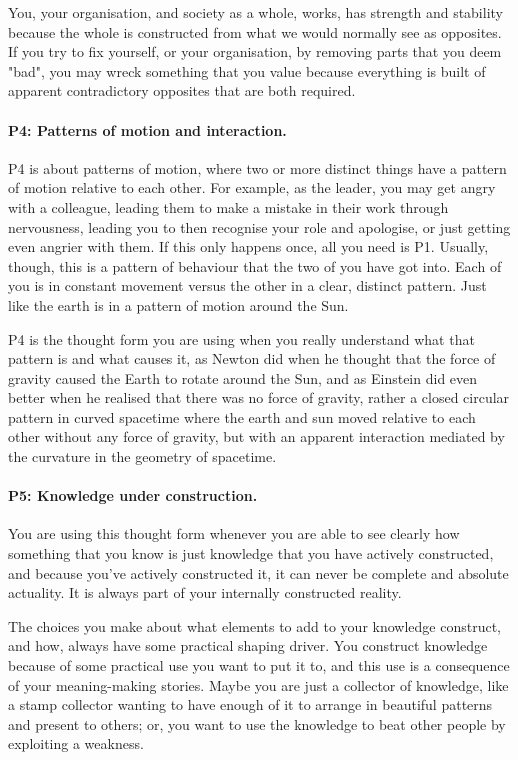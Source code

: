 You, your organisation, and society  as a whole, works, has strength and stability because the whole is constructed from what we would normally see as opposites. If you try to fix yourself, or your organisation, by removing parts that you deem "bad", you may wreck something that you value because everything is built of apparent contradictory opposites that are both required.
\paragraph{\textbf{P4: Patterns of motion and interaction.}}
P4 is about patterns of motion, where two or more distinct things have a pattern of motion relative to each other. For example, as the leader, you may get angry with a colleague, leading them to make a mistake in their work through nervousness, leading you to then recognise your role and apologise, or just getting even angrier with them. If this only happens once, all you need is P1. Usually, though, this is a pattern of behaviour that the two of you have got into. Each of you is in constant movement versus the other in a clear, distinct pattern. Just like the earth is in a pattern of motion around the Sun. 


P4 is the thought form you are using when you really understand what that pattern is and what causes it, as Newton  did when he thought that the force of gravity caused the Earth to rotate around the Sun, and as Einstein  did even better when he realised that there was no force of gravity, rather a closed circular pattern in curved spacetime where the earth and sun moved relative to each other without any force of gravity, but with an apparent interaction mediated by the curvature in the geometry of spacetime. 
\paragraph{\textbf{P5: Knowledge under construction.}}
You are using this thought form whenever you are able to see clearly how something that you know is just knowledge that you have actively constructed, and because you've actively constructed it, it can never be complete and absolute actuality.  It is always part of your internally constructed reality. 


The choices you make about what elements to add to your knowledge construct, and how, always have some practical shaping driver. You construct knowledge because of some practical use you want to put it to, and this use is a consequence of your meaning-making stories. Maybe you are just a collector of knowledge, like a stamp collector wanting to have enough of it to arrange in beautiful patterns and present to others; or, you want to use the knowledge to beat other people by exploiting a weakness.


